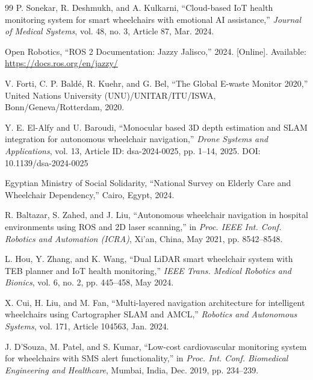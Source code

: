 \documentclass[12pt,a4paper]{report}
\begin{document}
\begin{singlespace}
\begin{thebibliography}{99}
P. Sonekar, R. Deshmukh, and A. Kulkarni, ``Cloud-based IoT health monitoring system for smart wheelchairs with emotional AI assistance,'' \textit{Journal of Medical Systems}, vol. 48, no. 3, Article 87, Mar. 2024.

Open Robotics, ``ROS 2 Documentation: Jazzy Jalisco,'' 2024. [Online]. Available: \url{https://docs.ros.org/en/jazzy/}











V. Forti, C. P. Bald{\'e}, R. Kuehr, and G. Bel, ``The Global E-waste Monitor 2020,'' United Nations University (UNU)/UNITAR/ITU/ISWA, Bonn/Geneva/Rotterdam, 2020.



Y. E. El-Alfy and U. Baroudi, ``Monocular based 3D depth estimation and SLAM integration for autonomous wheelchair navigation,'' \textit{Drone Systems and Applications}, vol. 13, Article ID: dsa-2024-0025, pp. 1--14, 2025. DOI: 10.1139/dsa-2024-0025

Egyptian Ministry of Social Solidarity, ``National Survey on Elderly Care and
Wheelchair Dependency,'' Cairo, Egypt, 2024.

R. Baltazar, S. Zahed, and J. Liu, ``Autonomous wheelchair navigation in hospital environments using ROS and 2D laser scanning,'' in \textit{Proc. IEEE Int. Conf. Robotics and Automation (ICRA)}, Xi'an, China, May 2021, pp. 8542--8548.

L. Hou, Y. Zhang, and K. Wang, ``Dual LiDAR smart wheelchair system with TEB planner and IoT health monitoring,'' \textit{IEEE Trans. Medical Robotics and Bionics}, vol. 6, no. 2, pp. 445--458, May 2024.

X. Cui, H. Liu, and M. Fan, ``Multi-layered navigation architecture for intelligent wheelchairs using Cartographer SLAM and AMCL,'' \textit{Robotics and Autonomous Systems}, vol. 171, Article 104563, Jan. 2024.





J. D'Souza, M. Patel, and S. Kumar, ``Low-cost cardiovascular monitoring system for wheelchairs with SMS alert functionality,'' in \textit{Proc. Int. Conf. Biomedical Engineering and Healthcare}, Mumbai, India, Dec. 2019, pp. 234--239.


\end{thebibliography}
\end{singlespace}
\end{document}
